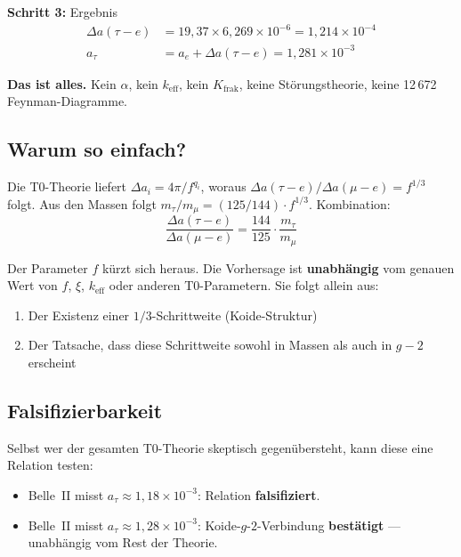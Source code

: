 	\textbf{Schritt 3:} Ergebnis
	\begin{align}
		\Delta a(\tau{-}e) &= 19{,}37 \times 6{,}269 \times 10^{-6} = 1{,}214 \times 10^{-4} \\
		a_\tau &= a_e + \Delta a(\tau{-}e) = \boxed{1{,}281 \times 10^{-3}}
	\end{align}
	
	\textbf{Das ist alles.} Kein $\alpha$, kein $k_\text{eff}$, kein $K_\text{frak}$, keine Störungstheorie, keine 12\,672 Feynman-Diagramme.
	
	\subsection{Warum so einfach?}
	
	Die T0-Theorie liefert $\Delta a_i = 4\pi/f^{q_i}$, woraus $\Delta a(\tau{-}e)/\Delta a(\mu{-}e) = f^{1/3}$ folgt. Aus den Massen folgt $m_\tau/m_\mu = (125/144) \cdot f^{1/3}$. Kombination:
	\begin{equation}
		\frac{\Delta a(\tau{-}e)}{\Delta a(\mu{-}e)} = \frac{144}{125} \cdot \frac{m_\tau}{m_\mu}
	\end{equation}
	
	Der Parameter $f$ kürzt sich heraus. Die Vorhersage ist \textbf{unabhängig} vom genauen Wert von $f$, $\xi$, $k_\text{eff}$ oder anderen T0-Parametern. Sie folgt allein aus:
	\begin{enumerate}
		\item Der Existenz einer $1/3$-Schrittweite (Koide-Struktur)
		\item Der Tatsache, dass diese Schrittweite sowohl in Massen als auch in $g-2$ erscheint
	\end{enumerate}
	
	\subsection{Falsifizierbarkeit}
	
	Selbst wer der gesamten T0-Theorie skeptisch gegenübersteht, kann diese eine Relation testen:
	\begin{itemize}
		\item Belle~II misst $a_\tau \approx 1{,}18 \times 10^{-3}$: Relation \textbf{falsifiziert}.
		\item Belle~II misst $a_\tau \approx 1{,}28 \times 10^{-3}$: Koide-$g$-$2$-Verbindung \textbf{bestätigt} — unabhängig vom Rest der Theorie.
	\end{itemize}
	
